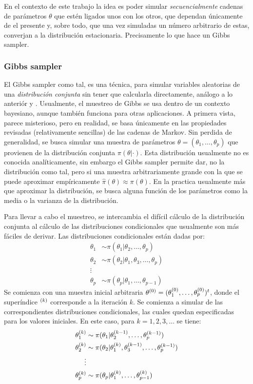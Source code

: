 \documentclass[../Main/Main.tex]{subfiles}
\begin{document}
En el contexto de este trabajo la idea es poder simular \textit{secuencialmente} cadenas de parámetros $\theta$ que estén ligados unos con los otros, que dependan únicamente de el presente y,  sobre todo, que una vez simuladas un número arbitrario de estas, converjan a la distribución estacionaria. Precisamente lo que hace un Gibbs sampler.

\subsubsection{Gibbs sampler}
El Gibbs sampler como tal, es una técnica, para simular variables aleatorias de una \textit{distribución conjunta} sin tener que calcularla directamente, análogo a lo anteriór\autocite{gelfand1990sampling} y \autocite{casella1992explaining}. Usualmente, el muestreo de Gibbs se usa dentro de un contexto bayesiano, aunque también funciona para otras aplicaciones. A primera vista, parece misterioso, pero en realidad, se basa únicamente en las propiedades revisadas (relativamente sencillas) de las cadenas de Markov. Sin perdida de generalidad, se busca simular una muestra de parámetros $\theta = (\theta_1,\ldots,\theta_p)$ que provienen de la distribución conjunta $\pi(\theta|\cdot)$. Esta distribución usualmente no es conocida analíticamente, sin embargo el Gibbs sampler permite dar, no la distribución como tal, pero si una muestra arbitrariamente grande con la que se puede aproximar empíricamente $\hat{\pi}(\theta) \approx \pi(\theta)$. En la practica usualmente más que aproximar la distribución, se busca alguna función de los parámetros como la media o la varianza de la distribución.

Para llevar a cabo el muestreo, se intercambia el difícil cálculo de la distribución conjunta al cálculo de las distribuciones condicionales que usualmente son más fáciles de derivar. Las distribuciones condicionales están dadas por: 
\begin{align}
	\theta_1 &\sim \pi(\theta_1|\theta_2,\ldots,\theta_p) \label{ec:DistCondicionales}\\
	\theta_2 &\sim \pi(\theta_2|\theta_1,\theta_3,\ldots,\theta_p)\nonumber \\ 
	\vdots \nonumber\\
	\theta_p &\sim \pi(\theta_p|\theta_1,\ldots,\theta_{p-1}) \nonumber
\end{align}
Se comienza con una muestra inicial arbitraria $\theta^{(0)} = (\theta_1^{(0)},\ldots,\theta_p^{(0)})^t$, donde el superíndice $^{(k)}$ corresponde a la iteración $k$. Se comienza a simular de las correspondientes distribuciones condicionales, las cuales quedan especificadas para los valores iniciales. En este caso, para $k = 1,2,3,\ldots$ se tiene:
\begin{align}
	\theta_1^{(k)} &\sim \pi(\theta_1|\theta_2^{(k-1)},\ldots,\theta_p^{(k-1)}) \label{ec:GibbsSampler}\\
	\theta_2^{(k)} &\sim \pi(\theta_2|\theta_1^{(k)},\theta_3^{(k-1)},\ldots,\theta_p^{(k-1)})\nonumber \\ 
	\vdots \nonumber\\
	\theta_p^{(k)} &\sim \pi(\theta_p|\theta_1^{(k)},\ldots,\theta_{p-1}^{(k)}) \nonumber
\end{align}
\end{document}
